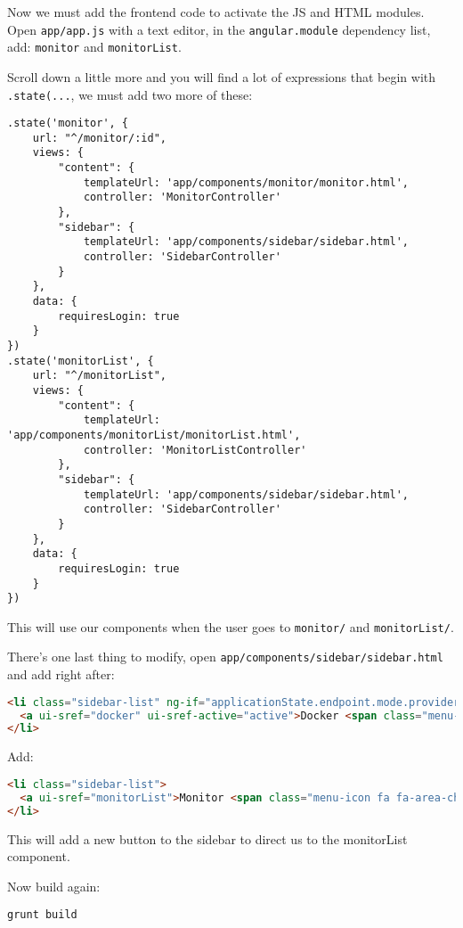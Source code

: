 Now we must add the frontend code to activate the JS and HTML modules. Open \texttt{app/app.js} with a text editor, in the \texttt{angular.module} dependency list, add: \texttt{monitor} and \texttt{monitorList}.

Scroll down a little more and you will find a lot of expressions that begin with \texttt{.state(...}, we must add two more of these:

\begin{lstlisting}
.state('monitor', {
    url: "^/monitor/:id",
    views: {
        "content": {
            templateUrl: 'app/components/monitor/monitor.html',
            controller: 'MonitorController'
        },
        "sidebar": {
            templateUrl: 'app/components/sidebar/sidebar.html',
            controller: 'SidebarController'
        }
    },
    data: {
        requiresLogin: true
    }
})
.state('monitorList', {
    url: "^/monitorList",
    views: {
        "content": {
            templateUrl: 'app/components/monitorList/monitorList.html',
            controller: 'MonitorListController'
        },
        "sidebar": {
            templateUrl: 'app/components/sidebar/sidebar.html',
            controller: 'SidebarController'
        }
    },
    data: {
        requiresLogin: true
    }
})
\end{lstlisting}

This will use our components when the user goes to \texttt{monitor/} and \texttt{monitorList/}.

There's one last thing to modify, open \texttt{app/components/sidebar/sidebar.html} and add right after:

\begin{lstlisting}[language=HTML]
<li class="sidebar-list" ng-if="applicationState.endpoint.mode.provider === 'DOCKER_STANDALONE'">
  <a ui-sref="docker" ui-sref-active="active">Docker <span class="menu-icon fa fa-th"></span></a>
</li>
\end{lstlisting}

Add:

\begin{lstlisting}[language=HTML]
<li class="sidebar-list">
  <a ui-sref="monitorList">Monitor <span class="menu-icon fa fa-area-chart"></span></a>
</li>
\end{lstlisting}

This will add a new button to the sidebar to direct us to the monitorList
component.

Now build again:

\begin{lstlisting}
grunt build
\end{lstlisting}

